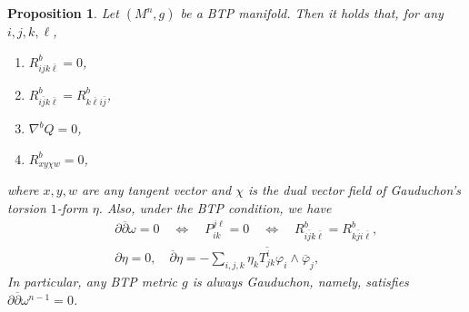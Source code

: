 \documentclass{amsart}
\numberwithin{equation}{section}
\newtheorem{proposition}[theorem]{Proposition}
\theoremstyle{definition}
\renewcommand{\1}{\mathds{1}}
\renewcommand{\>}{\rightarrow}
\begin{document}
\begin{proposition} \label{prop3.6}
Let $(M^n,g)$ be a BTP manifold. Then it holds that, for any $i,j,k,\ell$,
\begin{enumerate}
\item\label{R20=0} $R^b_{ijk\bar{\ell}}=0$,
\item\label{R11_12=34} $R^b_{i \bar{j} k \bar{\ell}} = R^b_{k \bar{\ell} i \bar{j}}$,
\item\label{Q_pll} $\nabla^b Q=0$,
\item\label{R=0} $R^b_{xy \chi w}=0$,
\end{enumerate}
where $x,y,w$ are any tangent vector and $\chi$ is the dual vector field of Gauduchon's torsion $1$-form $\eta$.
Also, under the BTP condition, we have
\begin{eqnarray}
&& \partial \overline{\partial} \omega =0 \quad \Longleftrightarrow \quad   P_{ik}^{j \ell}=0  \quad \Longleftrightarrow \quad
R^b_{i \bar{j} k \bar{\ell}} = R^b_{k \bar{j} i \bar{\ell}}, \label{eq_plcld}\\
&& \partial \eta=0,\quad \overline{\partial} \eta = -\sum_{i,j,k}\eta_k \overline{T^i_{jk}} \varphi_i \wedge \overline{\varphi}_j,
\end{eqnarray}
In particular, any BTP metric $g$ is always Gauduchon, namely, satisfies $\partial \overline{\partial} \omega^{n-1}=0$.
\end{proposition}
\end{document}
